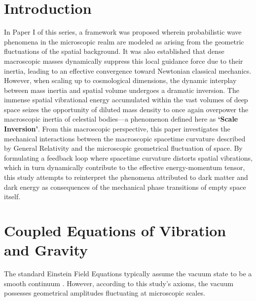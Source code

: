 \documentclass[reprint,amsmath,amssymb,aps,prd]{revtex4-2}
\begin{document}
\section{Introduction}
In Paper I of this series, a framework was proposed wherein probabilistic wave phenomena in the microscopic realm are modeled as arising from the geometric fluctuations of the spatial background.
It was also established that dense macroscopic masses dynamically suppress this local guidance force due to their inertia, leading to an effective convergence toward Newtonian classical mechanics.
However, when scaling up to cosmological dimensions, the dynamic interplay between mass inertia and spatial volume undergoes a dramatic inversion.
The immense spatial vibrational energy accumulated within the vast volumes of deep space seizes the opportunity of diluted mass density to once again overpower the macroscopic inertia of celestial bodies---a phenomenon defined here as \textbf{`Scale Inversion'}.
From this macroscopic perspective, this paper investigates the mechanical interactions between the macroscopic spacetime curvature described by General Relativity and the microscopic geometrical fluctuation of space.
By formulating a feedback loop where spacetime curvature distorts spatial vibrations, which in turn dynamically contribute to the effective energy-momentum tensor, this study attempts to reinterpret the phenomena attributed to dark matter and dark energy as consequences of the mechanical phase transitions of empty space itself.

\section{Coupled Equations of Vibration and Gravity}
The standard Einstein Field Equations typically assume the vacuum state to be a smooth continuum \cite{Einstein1916}.
However, according to this study's axioms, the vacuum possesses geometrical amplitudes fluctuating at microscopic scales.
\end{document}
